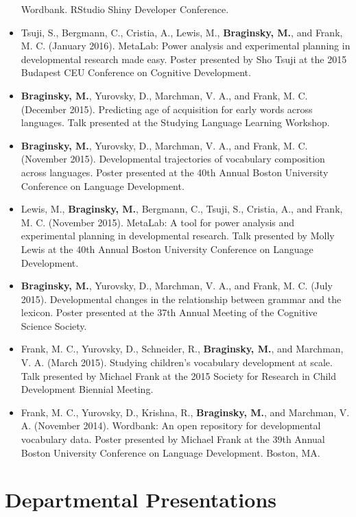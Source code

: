 \documentclass[11pt,]{article}
\begin{document}
\begin{itemize}
  Wordbank. RStudio Shiny Developer Conference.
\item
  Tsuji, S., Bergmann, C., Cristia, A., Lewis, M., \textbf{Braginsky,
  M.}, and Frank, M. C. (January 2016). MetaLab: Power analysis and
  experimental planning in developmental research made easy. Poster
  presented by Sho Tsuji at the 2015 Budapest CEU Conference on
  Cognitive Development.
\item
  \textbf{Braginsky, M.}, Yurovsky, D., Marchman, V. A., and Frank, M.
  C. (December 2015). Predicting age of acquisition for early words
  across languages. Talk presented at the Studying Language Learning
  Workshop.
\item
  \textbf{Braginsky, M.}, Yurovsky, D., Marchman, V. A., and Frank, M.
  C. (November 2015). Developmental trajectories of vocabulary
  composition across languages. Poster presented at the 40th Annual
  Boston University Conference on Language Development.
\item
  Lewis, M., \textbf{Braginsky, M.}, Bergmann, C., Tsuji, S., Cristia,
  A., and Frank, M. C. (November 2015). MetaLab: A tool for power
  analysis and experimental planning in developmental research. Talk
  presented by Molly Lewis at the 40th Annual Boston University
  Conference on Language Development.
\item
  \textbf{Braginsky, M.}, Yurovsky, D., Marchman, V. A., and Frank, M.
  C. (July 2015). Developmental changes in the relationship between
  grammar and the lexicon. Poster presented at the 37th Annual Meeting
  of the Cognitive Science Society.
\item
  Frank, M. C., Yurovsky, D., Schneider, R., \textbf{Braginsky, M.}, and
  Marchman, V. A. (March 2015). Studying children's vocabulary
  development at scale. Talk presented by Michael Frank at the 2015
  Society for Research in Child Development Biennial Meeting.
\item
  Frank, M. C., Yurovsky, D., Krishna, R., \textbf{Braginsky, M.}, and
  Marchman, V. A. (November 2014). Wordbank: An open repository for
  developmental vocabulary data. Poster presented by Michael Frank at
  the 39th Annual Boston University Conference on Language Development.
  Boston, MA.
\end{itemize}

\hypertarget{departmental-presentations}{%
\section{Departmental Presentations}\label{departmental-presentations}}
\end{document}
